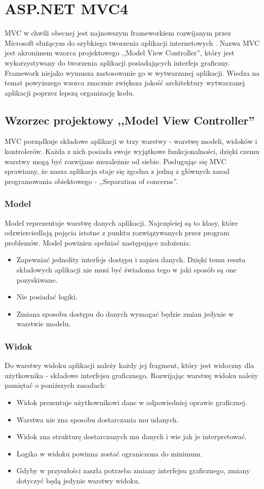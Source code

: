 \chapter{ASP.NET MVC4}
MVC w chwili obecnej jest najnowszym frameworkiem rozwijanym przez Microsoft służącym do szybkiego tworzenia aplikacji internetowych \cite{mvc-book}. Nazwa MVC jest akronimem wzorca projektowego ,,Model View Controller'', który jest wykorzystywany do tworzenia aplikacji posiadających interfejs graficzny. Framework niejako wymusza zastosowanie go w wytwarzanej aplikacji. Wiedza na temat powyższego wzorca znacznie zwiększa jakość architektury wytwarzanej aplikacji poprzez lepszą organizację kodu.

\section{Wzorzec projektowy ,,Model View Controller''}
MVC porządkuje składowe aplikacji w trzy warstwy - warstwę modeli, widoków i kontrolerów. Każda z nich posiada swoje wyjątkowe funkcjonalności, dzięki czemu warstwy mogą być rozwijane niezależnie od siebie. Posługując się MVC sprawiamy, że nasza aplikacja staje się zgodna z jedną z głównych zasad programowania obiektowego - ,,Separation of concerns''.

\subsection{Model}
Model reprezentuje warstwę danych aplikacji. Najczęściej są to klasy, które odzwierciedlają pojęcia istotne z punktu rozwiązywanych przez program problemów. Model powinien spełniać następujące założenia:
\begin{itemize}
\item Zapewniać jednolity interfejs dostępu i zapisu danych. Dzięki temu reszta składowych aplikacji nie musi być świadoma tego w jaki sposób są one pozyskiwane.
\item Nie posiadać logiki.
\item Zmiana sposobu dostępu do danych wymagać będzie zmian jedynie w warstwie modelu.
\end{itemize}

\subsection{Widok}
Do warstwy widoku aplikacji należy każdy jej fragment, który jest widoczny dla użytkownika - składowe interfejsu graficznego. Rozwijając warstwę widoku należy pamiętać o poniższych zasadach:
\begin{itemize}
\item Widok prezentuje użytkownikowi dane w odpowiedniej oprawie graficznej.
\item Warstwa nie zna sposobu dostarczania mu udanych.
\item Widok zna strukturę dostarczanych mu danych i wie jak je interpretować.
\item Logika w widoku powinna zostać ograniczona do minimum.
\item Gdyby w przyszłości zaszła potrzeba zmiany interfejsu graficznego, zmiany dotyczyć będą jedynie warstwy widoku.
\end{itemize}

